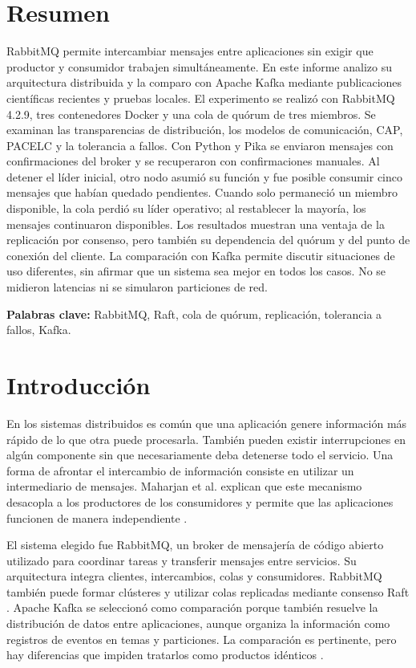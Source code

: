 \documentclass[12pt,a4paper]{article}
\begin{document}
\section*{Resumen}
RabbitMQ permite intercambiar mensajes entre aplicaciones sin exigir que productor y consumidor trabajen simultáneamente. En este informe analizo su arquitectura distribuida y la comparo con Apache Kafka mediante publicaciones científicas recientes y pruebas locales. El experimento se realizó con RabbitMQ 4.2.9, tres contenedores Docker y una cola de quórum de tres miembros. Se examinan las transparencias de distribución, los modelos de comunicación, CAP, PACELC y la tolerancia a fallos. Con Python y Pika se enviaron mensajes con confirmaciones del broker y se recuperaron con confirmaciones manuales. Al detener el líder inicial, otro nodo asumió su función y fue posible consumir cinco mensajes que habían quedado pendientes. Cuando solo permaneció un miembro disponible, la cola perdió su líder operativo; al restablecer la mayoría, los mensajes continuaron disponibles. Los resultados muestran una ventaja de la replicación por consenso, pero también su dependencia del quórum y del punto de conexión del cliente. La comparación con Kafka permite discutir situaciones de uso diferentes, sin afirmar que un sistema sea mejor en todos los casos. No se midieron latencias ni se simularon particiones de red.

\textbf{Palabras clave:} RabbitMQ, Raft, cola de quórum, replicación, tolerancia a fallos, Kafka.

\section{Introducción}
En los sistemas distribuidos es común que una aplicación genere información más rápido de lo que otra puede procesarla. También pueden existir interrupciones en algún componente sin que necesariamente deba detenerse todo el servicio. Una forma de afrontar el intercambio de información consiste en utilizar un intermediario de mensajes. Maharjan et al. explican que este mecanismo desacopla a los productores de los consumidores y permite que las aplicaciones funcionen de manera independiente \cite{Maharjan2023}.

El sistema elegido fue RabbitMQ, un broker de mensajería de código abierto utilizado para coordinar tareas y transferir mensajes entre servicios. Su arquitectura integra clientes, intercambios, colas y consumidores. RabbitMQ también puede formar clústeres y utilizar colas replicadas mediante consenso Raft \cite{RabbitMQQuorum2026}. Apache Kafka se seleccionó como comparación porque también resuelve la distribución de datos entre aplicaciones, aunque organiza la información como registros de eventos en temas y particiones. La comparación es pertinente, pero hay diferencias que impiden tratarlos como productos idénticos \cite{Maharjan2023}.
\end{document}
